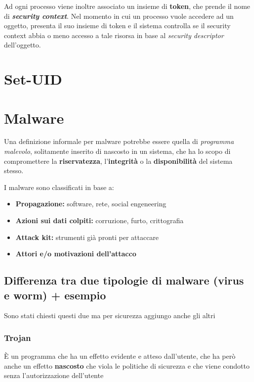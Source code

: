 \documentclass{report}
\begin{document}
\noindent Ad ogni processo viene inoltre associato un insieme di \textbf{token}, che prende il nome di 
\textbf{\textit{security context}}. Nel momento in cui un processo vuole accedere ad un oggetto, presenta 
il suo insieme di token e il sistema controlla se il security context abbia o meno accesso a tale risorsa 
in base al \textit{security descriptor} dell'oggetto.



\chapter{Set-UID}






\chapter{Malware}
\noindent Una definizione informale per malware potrebbe essere quella di \textit{programma malevolo},
solitamente inserito di nascosto in un sistema, che ha lo scopo di compromettere la \textbf{riservatezza}, l'\textbf{integrità} o la \textbf{disponibilità} 
del sistema stesso.

\noindent I malware sono classificati in base a:
\begin{itemize}
    \item \textbf{Propagazione:} software, rete, social engeneering
    \item \textbf{Azioni sui dati colpiti:} corruzione, furto, crittografia
    \item \textbf{Attack kit:} strumenti già pronti per attaccare
    \item \textbf{Attori e/o motivazioni dell'attacco}
\end{itemize}

\section{Differenza tra due tipologie di malware (virus e worm) + esempio}
\noindent Sono stati chiesti questi due ma per sicurezza aggiungo anche gli altri
\subsection{Trojan}
È un programma che ha un effetto evidente e atteso dall'utente, che ha però anche un 
effetto \textbf{nascosto} che viola le politiche di sicurezza e che viene condotto senza l'autorizzazione 
dell'utente
\end{document}
